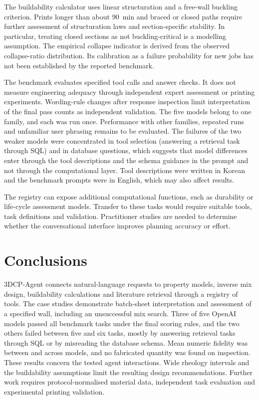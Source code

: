 \documentclass[preprint,12pt]{elsarticle}
\begin{document}
The buildability calculator uses linear structuration and a free-wall buckling criterion. Prints longer than about 90~min and braced or closed paths require further assessment of structuration laws and section-specific stability. In particular, treating closed sections as not buckling-critical is a modelling assumption. The empirical collapse indicator is derived from the observed collapse-ratio distribution. Its calibration as a failure probability for new jobs has not been established by the reported benchmark.

The benchmark evaluates specified tool calls and answer checks. It does not measure engineering adequacy through independent expert assessment or printing experiments. Wording-rule changes after response inspection limit interpretation of the final pass counts as independent validation. The five models belong to one family, and each was run once. Performance with other families, repeated runs and unfamiliar user phrasing remains to be evaluated. The failures of the two weaker models were concentrated in tool selection (answering a retrieval task through SQL) and in database questions, which suggests that model differences enter through the tool descriptions and the schema guidance in the prompt and not through the computational layer. Tool descriptions were written in Korean and the benchmark prompts were in English, which may also affect results.

The registry can expose additional computational functions, such as durability or life-cycle assessment models. Transfer to these tasks would require suitable tools, task definitions and validation. Practitioner studies are needed to determine whether the conversational interface improves planning accuracy or effort.

\section{Conclusions}\label{sec:conclusion}

3DCP-Agent connects natural-language requests to \nnModels{} property models, inverse mix design, buildability calculations and literature retrieval through a registry of \nnTools{} tools. The case studies demonstrate batch-sheet interpretation and assessment of a specified wall, including an unsuccessful mix search. Three of five OpenAI models passed all \nbenchCxN{} benchmark tasks under the final scoring rules, and the two others failed between five and six tasks, mostly by answering retrieval tasks through SQL or by misreading the database schema. Mean numeric fidelity was between \nbenchCuFidelity{} and \nbenchCsFidelity{} across models, and no fabricated quantity was found on inspection. These results concern the tested agent interactions. Wide rheology intervals and the buildability assumptions limit the resulting design recommendations. Further work requires protocol-normalised material data, independent task evaluation and experimental printing validation.
\end{document}
